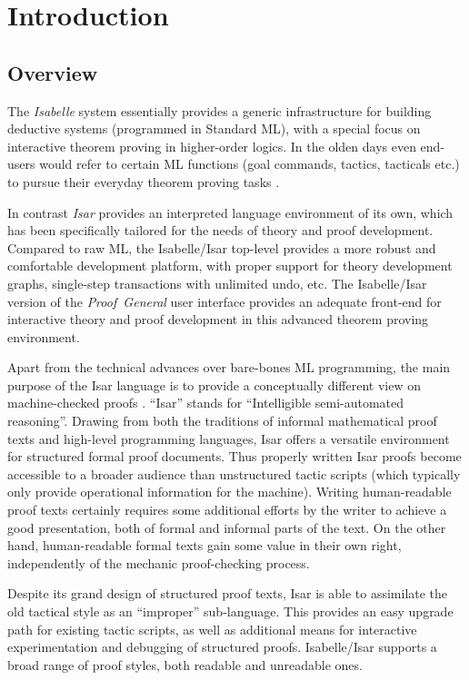 
\chapter{Introduction}

\section{Overview}

The \emph{Isabelle} system essentially provides a generic infrastructure for
building deductive systems (programmed in Standard ML), with a special focus
on interactive theorem proving in higher-order logics.  In the olden days even
end-users would refer to certain ML functions (goal commands, tactics,
tacticals etc.) to pursue their everyday theorem proving tasks
\cite{isabelle-intro,isabelle-ref}.
  
In contrast \emph{Isar} provides an interpreted language environment of its
own, which has been specifically tailored for the needs of theory and proof
development.  Compared to raw ML, the Isabelle/Isar top-level provides a more
robust and comfortable development platform, with proper support for theory
development graphs, single-step transactions with unlimited undo, etc.  The
Isabelle/Isar version of the \emph{Proof~General} user interface
\cite{proofgeneral,Aspinall:TACAS:2000} provides an adequate front-end for
interactive theory and proof development in this advanced theorem proving
environment.

\medskip Apart from the technical advances over bare-bones ML programming, the
main purpose of the Isar language is to provide a conceptually different view
on machine-checked proofs \cite{Wenzel:1999:TPHOL,Wenzel-PhD}.  ``Isar''
stands for ``Intelligible semi-automated reasoning''.  Drawing from both the
traditions of informal mathematical proof texts and high-level programming
languages, Isar offers a versatile environment for structured formal proof
documents.  Thus properly written Isar proofs become accessible to a broader
audience than unstructured tactic scripts (which typically only provide
operational information for the machine).  Writing human-readable proof texts
certainly requires some additional efforts by the writer to achieve a good
presentation, both of formal and informal parts of the text.  On the other
hand, human-readable formal texts gain some value in their own right,
independently of the mechanic proof-checking process.

Despite its grand design of structured proof texts, Isar is able to assimilate
the old tactical style as an ``improper'' sub-language.  This provides an easy
upgrade path for existing tactic scripts, as well as additional means for
interactive experimentation and debugging of structured proofs.  Isabelle/Isar
supports a broad range of proof styles, both readable and unreadable ones.

